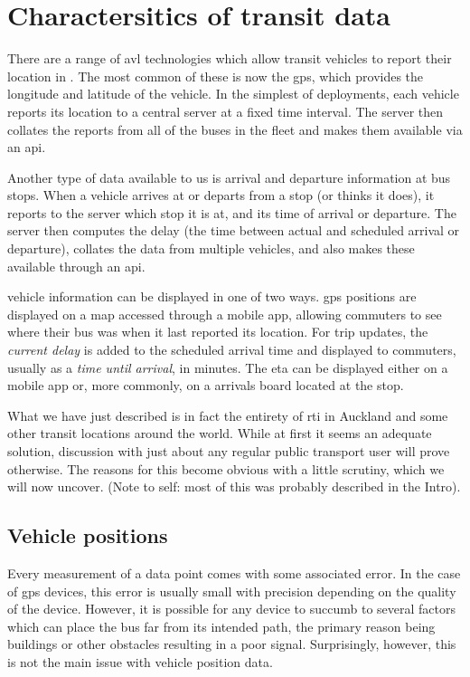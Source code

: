 \section{Charactersitics of \rt{} transit data}
\label{sec:realtime-data}

There are a range of \gls{avl} technologies which allow transit vehicles to report their location in \rt{}. The most common of these is now the \gls{gps}, which provides the longitude and latitude of the vehicle. In the simplest of deployments, each vehicle reports its location to a central server at a fixed time interval. The server then collates the reports from all of the buses in the fleet and makes them available via an \gls{api}.


Another type of \rt{} data available to us is arrival and departure information at bus stops. When a vehicle arrives at or departs from a stop (or thinks it does), it reports to the server which stop it is at, and its time of arrival or departure. The server then computes the delay (the time between actual and scheduled arrival or departure), collates the data from multiple vehicles, and also makes these available through an \gls{api}.


\Rt{} vehicle information can be displayed in one of two ways. \Gls{gps} positions are displayed on a map accessed through a mobile app, allowing commuters to see where their bus was when it last reported its location. For trip updates, the \emph{current delay} is added to the scheduled arrival time and displayed to commuters, usually as a \emph{time until arrival}, in minutes. The \gls{eta} can be displayed either on a mobile app or, more commonly, on a \rt{} arrivals board located at the stop.


What we have just described is in fact the entirety of \gls{rti} in Auckland and some other transit locations around the world. While at first it seems an adequate solution, discussion with just about any regular public transport user will prove otherwise. The reasons for this become obvious with a little scrutiny, which we will now uncover.
(Note to self: most of this was probably described in the Intro).


\subsection{Vehicle positions}
\label{sec:vp_data}

Every measurement of a data point comes with some associated error. In the case of \gls{gps} devices, this error is usually small with precision depending on the quality of the device. However, it is possible for any device to succumb to several factors which can place the bus far from its intended path, the primary reason being buildings or other obstacles resulting in a poor signal. Surprisingly, however, this is not the main issue with vehicle position data.


